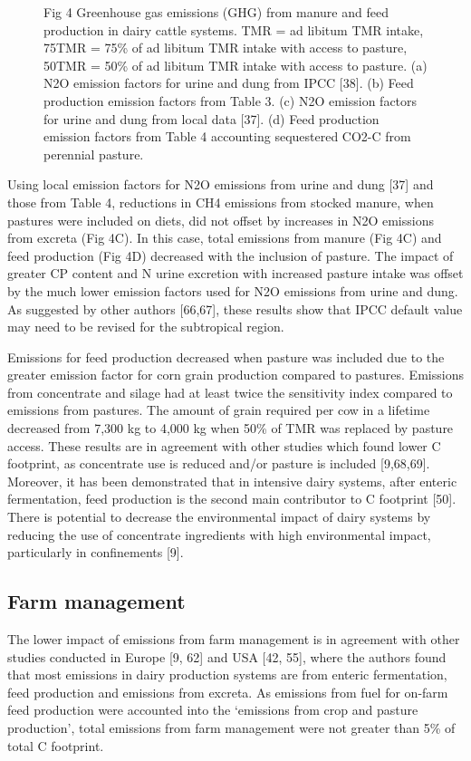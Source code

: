\documentclass[11pt,a4paper]{article}
\begin{document}
\begin{figure}[h]
\caption{Fig 4 Greenhouse gas emissions (GHG) from manure and feed production in dairy cattle systems. TMR = ad libitum TMR intake, 75TMR = 75\% of ad libitum TMR intake with access to pasture, 50TMR = 50\% of ad libitum TMR intake with access to pasture. (a) N2O emission factors for urine and dung from IPCC [38]. (b) Feed production emission factors from Table 3. (c) N2O emission factors for urine and dung from local data [37]. (d) Feed production emission factors from Table 4 accounting sequestered CO2-C from perennial pasture.}
\end{figure}

Using local emission factors for N2O emissions from urine and dung [37] and those from Table 4, reductions in CH4 emissions from stocked manure, when pastures were included on diets, did not offset by increases in N2O emissions from excreta (Fig 4C). In this case, total emissions from manure (Fig 4C) and feed production (Fig 4D) decreased with the inclusion of pasture. The impact of greater CP content and N urine excretion with increased pasture intake was offset by the much lower emission factors used for N2O emissions from urine and dung. As suggested by other authors [66,67], these results show that IPCC default value may need to be revised for the subtropical region.

Emissions for feed production decreased when pasture was included due to the greater emission factor for corn grain production compared to pastures. Emissions from concentrate and silage had at least twice the sensitivity index compared to emissions from pastures. The amount of grain required per cow in a lifetime decreased from 7,300 kg to 4,000 kg when 50\% of TMR was replaced by pasture access. These results are in agreement with other studies which found lower C footprint, as concentrate use is reduced and/or pasture is included [9,68,69]. Moreover, it has been demonstrated that in intensive dairy systems, after enteric fermentation, feed production is the second main contributor to C footprint [50]. There is potential to decrease the environmental impact of dairy systems by reducing the use of concentrate ingredients with high environmental impact, particularly in confinements [9].

\subsection{Farm management}

The lower impact of emissions from farm management is in agreement with other studies conducted in Europe [9, 62] and USA [42, 55], where the authors found that most emissions in dairy production systems are from enteric fermentation, feed production and emissions from excreta. As emissions from fuel for on-farm feed production were accounted into the ‘emissions from crop and pasture production’, total emissions from farm management were not greater than 5\% of total C footprint.
\end{document}
